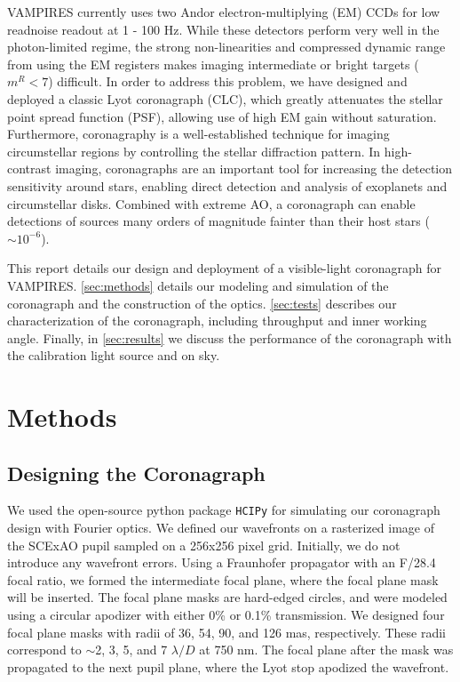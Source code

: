 \documentclass[]{spie}  %
\begin{document}
VAMPIRES currently uses two Andor electron-multiplying (EM) CCDs for low readnoise readout at 1 - 100 Hz. While these detectors perform very well in the photon-limited regime, the strong non-linearities and compressed dynamic range from using the EM registers makes imaging intermediate or bright targets ($m^R < 7$) difficult. In order to address this problem, we have designed and deployed a classic Lyot coronagraph (CLC), which greatly attenuates the stellar point spread function (PSF), allowing use of high EM gain without saturation. Furthermore, coronagraphy is a well-established technique for imaging circumstellar regions by controlling the stellar diffraction pattern. In high-contrast imaging, coronagraphs are an important tool for increasing the detection sensitivity around stars, enabling direct detection and analysis of exoplanets and circumstellar disks. Combined with extreme AO, a coronagraph can enable detections of sources many orders of magnitude fainter than their host stars ($\sim 10^{-6}$)\cite{guyon2018}.

This report details our design and deployment of a visible-light coronagraph for VAMPIRES. \autoref{sec:methods} details our modeling and simulation of the coronagraph and the construction of the optics. \autoref{sec:tests} describes our characterization of the coronagraph, including throughput and inner working angle. Finally, in \autoref{sec:results} we discuss the performance of the coronagraph with the calibration light source and on sky.

\section{Methods}\label{sec:methods}

\subsection{Designing the Coronagraph}\label{sec:design}

We used the open-source python package \texttt{HCIPy}\cite{por2018} for simulating our coronagraph design with Fourier optics. We defined our wavefronts on a rasterized image of the SCExAO pupil sampled on a 256x256 pixel grid. Initially, we do not introduce any wavefront errors. Using a Fraunhofer propagator with an F/28.4 focal ratio, we formed the intermediate focal plane, where the focal plane mask will be inserted. The focal plane masks are hard-edged circles, and were modeled using a circular apodizer with either 0\% or 0.1\% transmission. We designed four focal plane masks with radii of 36, 54, 90, and 126 mas, respectively. These radii correspond to $\sim$2, 3, 5, and 7 $\lambda/D$ at 750 nm. The focal plane after the mask was propagated to the next pupil plane, where the Lyot stop apodized the wavefront.
\end{document}

